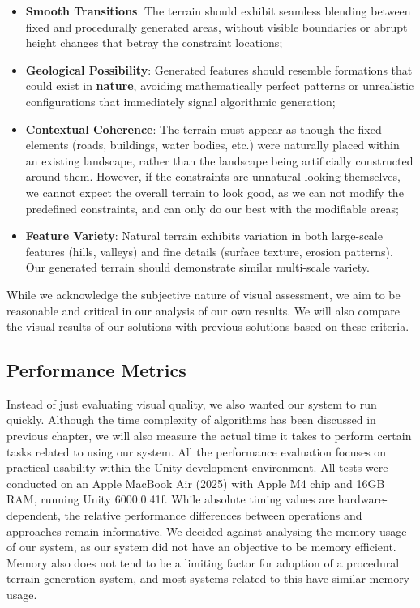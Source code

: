 \begin{itemize}
    \item \textbf{Smooth Transitions}: The terrain should exhibit seamless blending between fixed and procedurally generated areas, without visible boundaries or abrupt height changes that betray the constraint locations;
    
    \item \textbf{Geological Possibility}: Generated features should resemble formations that could exist in \textbf{nature}, avoiding mathematically perfect patterns or unrealistic configurations that immediately signal algorithmic generation;
    
    \item \textbf{Contextual Coherence}: The terrain must appear as though the fixed elements (roads, buildings, water bodies, etc.) were naturally placed within an existing landscape, rather than the landscape being artificially constructed around them. However, if the constraints are unnatural looking themselves, we cannot expect the overall terrain to look good, as we can not modify the predefined constraints, and can only do our best with the modifiable areas;
    
    \item \textbf{Feature Variety}: Natural terrain exhibits variation in both large-scale features (hills, valleys) and fine details (surface texture, erosion patterns). Our generated terrain should demonstrate similar multi-scale variety.
\end{itemize}

While we acknowledge the subjective nature of visual assessment, we aim to be reasonable and critical in our analysis of our own results. We will also compare the visual results of our solutions with previous solutions based on these criteria. 

\subsection{Performance Metrics}
\label{performance_metrics}

Instead of just evaluating visual quality, we also wanted our system to run quickly. Although the time complexity of algorithms has been discussed in previous chapter, we will also measure the actual time it takes to perform certain tasks related to using our system. All the performance evaluation focuses on practical usability within the Unity development environment. All tests were conducted on an Apple MacBook Air (2025) with Apple M4 chip and 16GB RAM, running Unity 6000.0.41f. While absolute timing values are hardware-dependent, the relative performance differences between operations and approaches remain informative. 
We decided against analysing the memory usage of our system, as our system did not have an objective to be memory efficient. Memory also does not tend to be a limiting factor for adoption of a procedural terrain generation system, and most systems related to this have similar memory usage.


